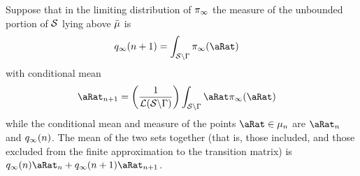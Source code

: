 \documentclass[\econtexRoot/BufferStockTheory.tex]{subfiles}
\begin{document}
Suppose that in the limiting distribution of $\pi_{\infty}$ the measure of the unbounded portion of $\mathcal{S}$ lying above $\bar{\mu}$ is
\begin{align}
  \pmfBinNow_{\infty}({\NumAprxStes+1}) & =\int_{\SetFullCnts \backslash \KrnPntNxtFmPntNowSetSprtTrnc}\DnsPnt_{\infty}(\pnt)  
\end{align}
with conditional mean
\begin{align}
  \pnterp_{\NumAprxStes+1} & = \left(\frac{1}{\Lebes(\SetFullCnts \backslash \KrnPntNxtFmPntNowSetSprtTrnc)}\right)\int_{\SetFullCnts \backslash \KrnPntNxtFmPntNowSetSprtTrnc}\pnt \DnsPnt_{\infty}(\pnt)  
\end{align}
while the conditional mean and measure of the points $\pnt \in \SetPartCnts_{\NumAprxStes}$ are $\pnterp_{\NumAprxStes}$ and $q_{\infty}(n)$.  The mean of the two sets together (that is, those included, and those excluded from the finite approximation to the transition matrix) is $\pmfBinNow_{\infty}(\NumAprxStes)\pnterp_{\NumAprxStes}+\pmfBinNow_{\infty}(\NumAprxStes+1)\pnterp_{\NumAprxStes+1}$.

\begin{comment}
We add to the probability mass of the last point the probability mass in the unbounded region above $\Top{\SetPartCnts}_{\NumAprxStes}$:
\begin{align}
  \hat{\pmfBinNow}_{\infty}(\NumAprxStes) & = \pmfBinNow_{\infty}(\NumAprxStes)+\pmfBinNow_{\infty}(\NumAprxStes+1)
\end{align}
and the adjusted location of the last point mass is implicitly given by 
\begin{align}
  \hat{\pmfBinNow}_{\infty}(\NumAprxStes)\hat{\pnterp}_{\NumAprxStes}    & = \pmfBinNow_{\infty}(\NumAprxStes)\pnterp_{\NumAprxStes}+\pmfBinNow_{\infty}(\NumAprxStes+1)\pnterp_{\NumAprxStes+1}
  \\    \hat{\pnterp}_{\NumAprxStes}    & = \left(\frac{\pmfBinNow_{\infty}(\NumAprxStes)\pnterp_{\NumAprxStes}+\pmfBinNow_{\infty}(\NumAprxStes+1)\pnterp_{\NumAprxStes+1}}{\hat{\pmfBinNow}_{\infty}(\NumAprxStes)}\right)
\end{align}

\end{comment} %


\begin{comment}
  This can be done in a mean preserving way easily: Multiply the value of the last mass point in the Markov matrix by:
  \begin{align}
    & = \left(\frac{(\int_{\SetFullCnts \backslash \KrnPntNxtFmPntNowSetSprtTrnc} \pnt \DnsPnt(\pnt))+(\int_{\Bot{\NumAprxStes}}^{\Top{\NumAprxStes}} \pnt \DnsPnt(\pnt))}{(\int_{\Bot{\NumAprxStes}}^{\Top{\NumAprxStes}} \pnt \DnsPnt(\pnt))}\right)
  \end{align}
\end{comment}
\end{document}

